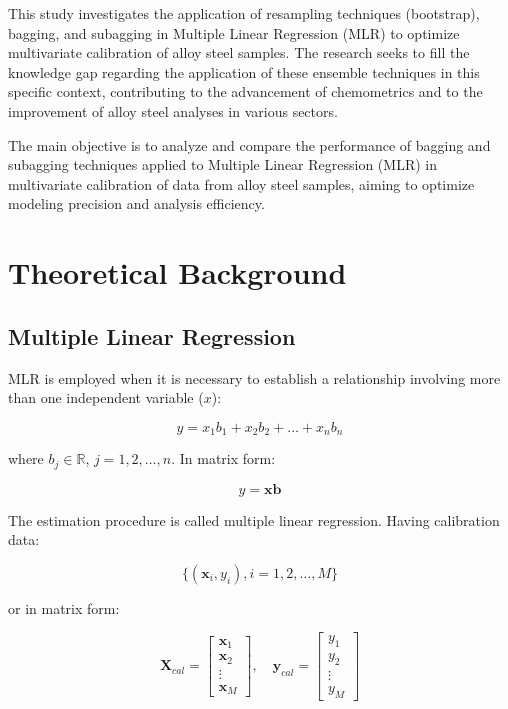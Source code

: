 \documentclass[12pt]{article}
\begin{document}
This study investigates the application of resampling techniques (bootstrap), bagging, and subagging in Multiple Linear Regression (MLR) to optimize multivariate calibration of alloy steel samples. The research seeks to fill the knowledge gap regarding the application of these ensemble techniques in this specific context, contributing to the advancement of chemometrics and to the improvement of alloy steel analyses in various sectors.\cite{GALVAO:2006}

The main objective is to analyze and compare the performance of bagging and subagging techniques applied to Multiple Linear Regression (MLR) in multivariate calibration of data from alloy steel samples, aiming to optimize modeling precision and analysis efficiency.

\section{Theoretical Background}

\subsection{Multiple Linear Regression}

MLR is employed when it is necessary to establish a relationship involving more than one independent variable ($x$):

\begin{equation}
y = x_1b_1 + x_2b_2 + \ldots + x_nb_n
\end{equation}

\noindent where $b_j \in \mathbb{R}$, $j = 1, 2, \ldots, n$. In matrix form:

\begin{equation}
y = \mathbf{xb}
\end{equation}

The estimation procedure is called multiple linear regression.\cite{KRAMER:1998, MARTENS:1989} Having calibration data:

\begin{equation}
\{(\mathbf{x}_i, y_i), i = 1, 2, \ldots, M\}
\end{equation}

or in matrix form:

\begin{equation}
\mathbf{X}_{cal} = \begin{bmatrix} \mathbf{x}_1 \\ \mathbf{x}_2 \\ \vdots \\ \mathbf{x}_M \end{bmatrix}, \quad
\mathbf{y}_{cal} = \begin{bmatrix} y_1 \\ y_2 \\ \vdots \\ y_M \end{bmatrix}
\end{equation}
\end{document}
